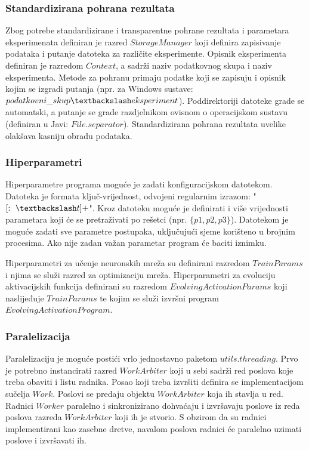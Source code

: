 \documentclass[times, utf8, numeric, diplomski]{fer}
\begin{document}
\subsubsection{Standardizirana pohrana rezultata}
Zbog potrebe standardizirane i transparentne pohrane rezultata i parametara eksperimenata definiran je razred $StorageManager$ koji definira zapisivanje podataka i putanje datoteka za različite eksperimente. Opisnik eksperimenta definiran je razredom $Context$, a sadrži naziv podatkovnog skupa i naziv eksperimenta. Metode za pohranu primaju podatke koji se zapisuju i opisnik kojim se izgradi putanja (npr. za Windows sustave: $podatkovni\_skup \textbackslash eksperiment$). Poddirektoriji datoteke grade se automatski, a putanje se grade razdjelnikom ovisnom o operacijskom sustavu (definiran u Javi: $File.separator$). Standardizirana pohrana rezultata uvelike olakšava kasniju obradu podataka.

\subsubsection{Hiperparametri}
Hiperparametre programa moguće je zadati konfiguracijskom datotekom. Datoteka je formata ključ-vrijednost, odvojeni regularnim izrazom: "$[:\ \textbackslash t]+$". Kroz datoteku moguće je definirati i više vrijednosti parametara koji će se pretraživati po rešetci (npr. $\{p1,p2,p3\}$). Datotekom je moguće zadati sve parametre postupaka, uključujući sjeme korišteno u brojnim procesima. Ako nije zadan važan parametar program će baciti iznimku.

Hiperparametri za učenje neuronskih mreža su definirani razredom $TrainParams$ i njima se služi razred za optimizaciju mreža. Hiperparametri za evoluciju aktivacijskih funkcija definirani su razredom $EvolvingActivationParams$ koji naslijeđuje $TrainParams$ te kojim se služi izvršni program $EvolvingActivationProgram$.

\subsubsection{Paralelizacija}
Paralelizaciju je moguće postići vrlo jednostavno paketom $utils.threading$. Prvo je potrebno instancirati razred $WorkArbiter$ koji u sebi sadrži red poslova koje treba obaviti i listu radnika. Posao koji treba izvršiti definira se implementacijom sučelja $Work$. Poslovi se predaju objektu $WorkArbiter$ koja ih stavlja u red. Radnici $Worker$ paralelno i sinkronizirano dohvaćaju i izvršavaju poslove iz reda poslova razreda $WorkArbiter$ koji ih je stvorio. S obzirom da su radnici implementirani kao zasebne dretve, navalom poslova radnici će paralelno uzimati poslove i izvršavati ih.
\end{document}
